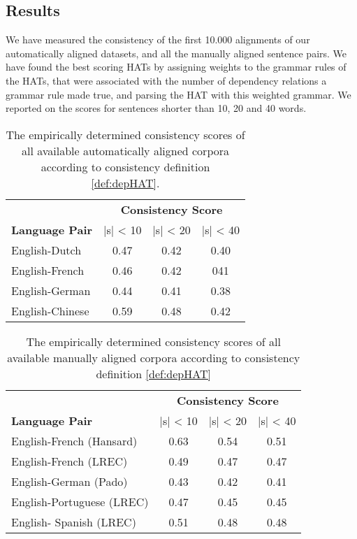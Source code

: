 \subsection{Results}

We have measured the consistency of the first 10.000 alignments of our automatically aligned datasets, and all the manually aligned sentence pairs. We have found the best scoring HATs by assigning weights to the grammar rules of the HATs, that were associated with the number of dependency relations a grammar rule made true, and parsing the HAT with this weighted grammar. We reported on the scores for sentences shorter than 10, 20 and 40 words.

\begin{table}[!ht]
\centering
\begin{tabular}{|l|c|c|c|}
\hline
&\multicolumn{3}{c|}{\textbf{Consistency Score}}\\
\textbf{Language Pair} & |s| < 10 & |s| < 20 & |s| < 40\\
\hline \hline
English-Dutch & 0.47 & 0.42 & 0.40 \\
\hline
English-French & 0.46 & 0.42 & 041 \\
\hline
English-German & 0.44 & 0.41 & 0.38 \\
\hline
English-Chinese & 0.59 & 0.48 & 0.42\\
\hline
\end{tabular}
\caption{The empirically determined consistency scores of all available automatically aligned corpora according to consistency definition \ref{def:depHAT}.}\label{tab:scores1}
\end{table}

\begin{table}[!ht]
\centering
\begin{tabular}{|l|c|c|c|}
\hline
&\multicolumn{3}{c|}{\textbf{Consistency Score}}\\
\textbf{Language Pair} & |s| < 10 & |s| < 20 & |s| < 40\\
\hline \hline
English-French (Hansard) & 0.63 & 0.54 & 0.51 \\
\hline
English-French (LREC) & 0.49 & 0.47 & 0.47 \\
\hline
English-German (Pado) & 0.43 & 0.42 & 0.41 \\
\hline
English-Portuguese (LREC) & 0.47 & 0.45 & 0.45 \\
\hline
English- Spanish (LREC) & 0.51 & 0.48 & 0.48\\
\hline
\end{tabular}
\caption{The empirically determined consistency scores of all available manually aligned corpora according to consistency definition \ref{def:depHAT}}\label{tab:scores2}
\end{table}

